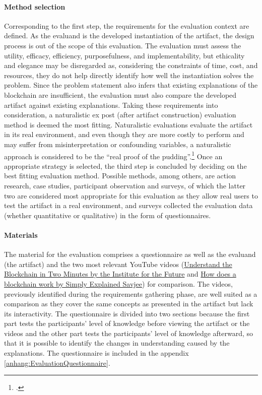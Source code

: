 \paragraph{Method selection} Corresponding to the first step, the requirements for the evaluation context are defined. As the evaluand is the developed instantiation of the artifact, the design process is out of the scope of this evaluation. The evaluation must assess the utility, efficacy, efficiency, purposefulness, and implementability, but ethicality and elegance may be disregarded as, considering the constraints of time, cost, and resources, they do not help directly identify how well the instantiation solves the problem. Since the problem statement also infers that existing explanations of the blockchain are insufficient, the evaluation must also compare the developed artifact against existing explanations. Taking these requirements into consideration, a naturalistic ex post (after artifact construction) evaluation method is deemed the most fitting. Naturalistic evaluations evaluate the artifact in its real environment, and even though they are more costly to perform and may suffer from misinterpretation or confounding variables, a naturalistic approach is considered to be the \enquote{real proof of the pudding}.\footcites[Cf.][p.6, p.3 et seq]{Pries-HejeStrategiesDesignScience}[cf.][p.80]{PfeffersDesignScienceResearch2012} Once an appropriate strategy is selected, the third step is concluded by deciding on the best fitting evaluation method. Possible methods, among others, are action research, case studies, participant observation and surveys, of which the latter two are considered most appropriate for this evaluation as they allow real users to test the artifact in a real environment, and surveys collected the evaluation data (whether quantitative or qualitative) in the form of questionnaires. 

\paragraph{Materials} The material for the evaluation comprises a questionnaire as well as the evaluand (the artifact) and the two most relevant YouTube videos (\href{https://www.youtube.com/watch?v=r43LhSUUGTQ}{Understand the Blockchain in Two Minutes by the Institute for the Future} and \href{https://www.youtube.com/watch?v=SSo_EIwHSd4}{How does a blockchain work by Simply Explained Savjee}) for comparison. The videos, previously identified during the requirements gathering phase, are well suited as a comparison as they cover the same concepts as presented in the artifact but lack its interactivity. The questionnaire is divided into two sections because the first part tests the participants' level of knowledge before viewing the artifact or the videos and the other part tests the participants' level of knowledge afterward, so that it is possible to identify the changes in understanding caused by the explanations. The questionnaire is included in the appendix \ref{anhang:EvaluationQuestionnaire}. 

